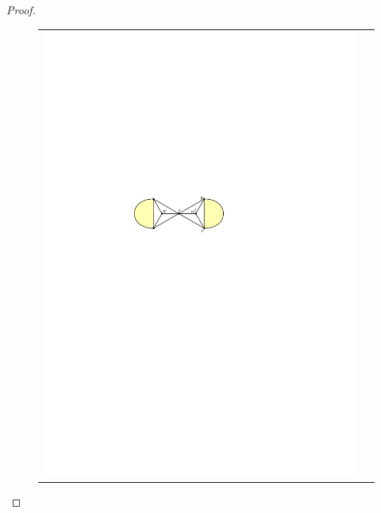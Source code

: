 \documentclass[12pt]{article}
\theoremstyle{definition}
\begin{document}
\begin{proof}
\begin{figure}[htpb]
\begin{tabular}{cc}
      \includegraphics[page=2]{figs/isolated} &

\end{tabular}
\end{figure}
\end{proof}
\end{document}

